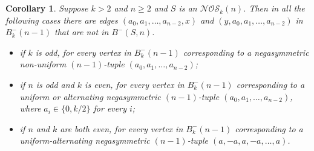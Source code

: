 \documentclass[10pt,a4paper]{amsart}
\newtheorem{corollary}{Corollary}
\begin{document}
\begin{corollary}  \label{corollary:excluded-tuples-by-parity}
Suppose $k>2$ and $n\geq2$ and $S$ is an $\mathcal{NOS}_k(n)$. Then in all the following cases
there are edges $(a_0,a_1,\ldots,a_{n-2},x)$ and $(y,a_0,a_1,\ldots,a_{n-2})$ in $B^-_k(n-1)$
that are not in $B^-(S,n)$.
\begin{itemize}
\item[i)] if $k$ is odd, for every vertex in $B^-_k(n-1)$ corresponding to a negasymmetric
    non-uniform $(n-1)$-tuple $(a_0,a_1,\ldots,a_{n-2})$;
\item[ii)] if $n$ is odd and $k$ is even, for every vertex in $B^-_k(n-1)$ corresponding to a
    uniform or alternating negasymmetric $(n-1)$-tuple $(a_0,a_1,\ldots,a_{n-2})$, where
    $a_i\in\{0,k/2\}$ for every $i$;
\item[iii)] if $n$ and $k$ are both even, for every vertex in $B^-_k(n-1)$ corresponding to a
    uniform-alternating negasymmetric $(n-1)$-tuple $(a,-a,a,-a,\dots,a)$.
\end{itemize}
\end{corollary}
\end{document}
